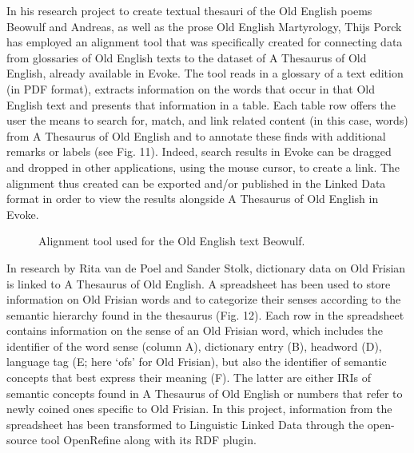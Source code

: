 In his research project to create textual thesauri of the Old English poems Beowulf and Andreas, as well as the prose Old English Martyrology, Thijs Porck has employed an alignment tool that was specifically created for connecting data from glossaries of Old English texts to the dataset of A Thesaurus of Old English, already available in Evoke. The tool reads in a glossary of a text edition (in PDF format), extracts information on the words that occur in that Old English text and presents that information in a table. Each table row offers the user the means to search for, match, and link related content (in this case, words) from A Thesaurus of Old English and to annotate these finds with additional remarks or labels (see Fig. 11). Indeed, search results in Evoke can be dragged and dropped in other applications, using the mouse cursor, to create a link.  The alignment thus created can be exported and/or published in the Linked Data format in order to view the results alongside A Thesaurus of Old English in Evoke.

\begin{figure}[htbp]
	\caption[]{\label{fig:Stolk2021a:Fig11} Alignment tool used for the Old English text Beowulf.}
\end{figure}

In research by Rita van de Poel and Sander Stolk, dictionary data on Old Frisian is linked to A Thesaurus of Old English. A spreadsheet has been used to store information on Old Frisian words and to categorize their senses according to the semantic hierarchy found in the thesaurus (Fig. 12). Each row in the spreadsheet contains information on the sense of an Old Frisian word, which includes the identifier of the word sense (column A), dictionary entry (B), headword (D), language tag (E; here ‘ofs’ for Old Frisian), but also the identifier of semantic concepts that best express their meaning (F). The latter are either IRIs of semantic concepts found in A Thesaurus of Old English or numbers that refer to newly coined ones specific to Old Frisian. In this project, information from the spreadsheet has been transformed to Linguistic Linked Data through the open-source tool OpenRefine along with its RDF plugin. 

